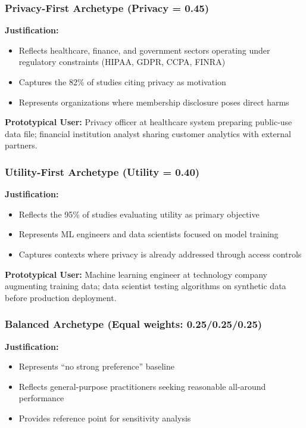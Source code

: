\documentclass[12pt,a4paper]{article}
\begin{document}
\subsubsection{Privacy-First Archetype (Privacy = 0.45)}

\textbf{Justification:}
\begin{itemize}
    \item Reflects healthcare, finance, and government sectors operating under regulatory constraints (HIPAA, GDPR, CCPA, FINRA)
    \item Captures the 82\% of studies citing privacy as motivation
    \item Represents organizations where membership disclosure poses direct harms
\end{itemize}

\textbf{Prototypical User:} Privacy officer at healthcare system preparing public-use data file; financial institution analyst sharing customer analytics with external partners.

\subsubsection{Utility-First Archetype (Utility = 0.40)}

\textbf{Justification:}
\begin{itemize}
    \item Reflects the 95\% of studies evaluating utility as primary objective
    \item Represents ML engineers and data scientists focused on model training
    \item Captures contexts where privacy is already addressed through access controls
\end{itemize}

\textbf{Prototypical User:} Machine learning engineer at technology company augmenting training data; data scientist testing algorithms on synthetic data before production deployment.

\subsubsection{Balanced Archetype (Equal weights: 0.25/0.25/0.25)}

\textbf{Justification:}
\begin{itemize}
    \item Represents ``no strong preference'' baseline
    \item Reflects general-purpose practitioners seeking reasonable all-around performance
    \item Provides reference point for sensitivity analysis
\end{itemize}
\end{document}
